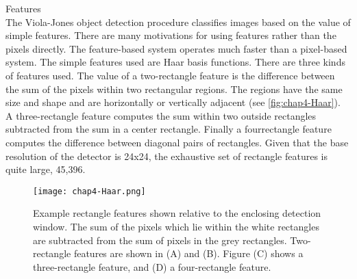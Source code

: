 \begin{compactitem}
\item {Features}\\
The Viola-Jones object detection procedure classifies images based on the value of simple features.
There are many motivations for using features rather than the pixels directly. The feature-based system
operates much faster than a pixel-based system.
The simple features used are Haar basis functions. There are three kinds of features used.
The value of a two-rectangle feature is the difference between the sum of the pixels within
two rectangular regions. The regions have the same size and shape and are horizontally
or vertically adjacent (see \autoref{fig:chap4-Haar}). A three-rectangle feature computes the sum within
two outside rectangles subtracted from the sum in a center rectangle. Finally a fourrectangle
feature computes the difference between diagonal pairs of rectangles.
Given that the base resolution of the detector is 24x24, the exhaustive set of rectangle
features is quite large, 45,396.

\begin{figure}[h]
  \centering
	\texttt{[image: chap4-Haar.png]}
  \caption{Example rectangle features shown relative to the enclosing detection window.
The sum of the pixels which lie within the white rectangles are subtracted from the
sum of pixels in the grey rectangles. Two-rectangle features are shown in (A) and (B).
Figure (C) shows a three-rectangle feature, and (D) a four-rectangle feature.}
  \label{fig:chap4-Haar}
\end{figure}


\end{compactitem}
